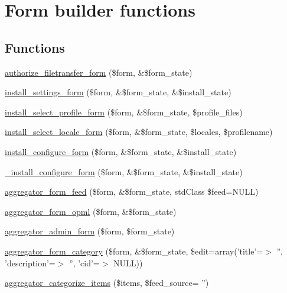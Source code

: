 \hypertarget{group__forms}{
\section{Form builder functions}
\label{group__forms}
}
\subsection*{Functions}
\begin{DoxyCompactItemize}
\item 
\hyperlink{group__forms_gac54653dcbe434c2a6519e228874bba30}{authorize\_\-filetransfer\_\-form} (\$form, \&\$form\_\-state)
\item 
\hyperlink{group__forms_ga4fe8554aa15e5b0b78a15400c2d37d28}{install\_\-settings\_\-form} (\$form, \&\$form\_\-state, \&\$install\_\-state)
\item 
\hyperlink{group__forms_ga1ead61881194a861349f2c1c1e508752}{install\_\-select\_\-profile\_\-form} (\$form, \&\$form\_\-state, \$profile\_\-files)
\item 
\hyperlink{group__forms_ga7c540506932fb00783972b742787ddeb}{install\_\-select\_\-locale\_\-form} (\$form, \&\$form\_\-state, \$locales, \$profilename)
\item 
\hyperlink{group__forms_ga38e5d79d667dbc48f40ca4238d6d161b}{install\_\-configure\_\-form} (\$form, \&\$form\_\-state, \&\$install\_\-state)
\item 
\hyperlink{group__forms_ga21b381d33cf055bce4286d99dafad24b}{\_\-install\_\-configure\_\-form} (\$form, \&\$form\_\-state, \&\$install\_\-state)
\item 
\hyperlink{group__forms_ga6c746c1b1d0d29d1564f215cd1fe69e3}{aggregator\_\-form\_\-feed} (\$form, \&\$form\_\-state, stdClass \$feed=NULL)
\item 
\hyperlink{group__forms_gaf23a2363758db071378145309e4ee993}{aggregator\_\-form\_\-opml} (\$form, \&\$form\_\-state)
\item 
\hyperlink{group__forms_gaf74e45e5f77c20f8e8483e13aea0d25c}{aggregator\_\-admin\_\-form} (\$form, \$form\_\-state)
\item 
\hyperlink{group__forms_gaf977e902973833a5a8fe5431ba5b829d}{aggregator\_\-form\_\-category} (\$form, \&\$form\_\-state, \$edit=array('title'=$>$ '', 'description'=$>$ '', 'cid'=$>$ NULL))
\item 
\hyperlink{group__forms_gad110881d125af4a6c5c2182a52fe4c69}{aggregator\_\-categorize\_\-items} (\$items, \$feed\_\-source= '')
\item 

\end{DoxyCompactItemize}
